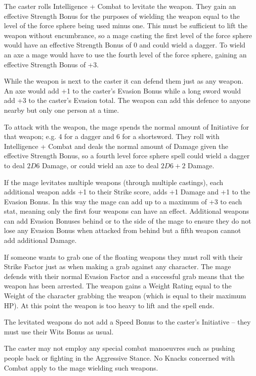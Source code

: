 \documentclass[titlepage,a4paper,openany]{book}
\begin{document}
\begin{multicols}{2}
The caster rolls Intelligence + Combat to levitate the weapon. They gain an effective Strength Bonus for the purposes of wielding the weapon equal to the level of the force sphere being used minus one. This must be sufficient to lift the weapon without encumbrance, so a mage casting the first level of the force sphere would have an effective Strength Bonus of 0 and could wield a dagger. To wield an axe a mage would have to use the fourth level of the force sphere, gaining an effective Strength Bonus of +3.

While the weapon is next to the caster it can defend them just as any weapon. An axe would add +1 to the caster's Evasion Bonus while a long sword would add +3 to the caster's Evasion total. The weapon can add this defence to anyone nearby but only one person at a time.

To attack with the weapon, the mage spends the normal amount of Initiative for that weapon; e.g. 4 for a dagger and 6 for a shortsword. They roll with Intelligence + Combat and deals the normal amount of Damage given the effective Strength Bonus, so a fourth level force sphere spell could wield a dagger to deal $2D6$ Damage, or could wield an axe to deal $2D6+2$ Damage.

If the mage levitates multiple weapons (through multiple castings), each additional weapon adds +1 to their Strike score, adds +1 Damage and +1 to the Evasion Bonus. In this way the mage can add up to a maximum of +3 to each stat, meaning only the first four weapons can have an effect. Additional weapons can add Evasion Bonuses behind or to the side of the mage to ensure they do not lose any Evasion Bonus when attacked from behind but a fifth weapon cannot add additional Damage.

If someone wants to grab one of the floating weapons they must roll with their Strike Factor just as when making a grab against any character. The mage defends with their normal Evasion Factor and a successful grab means that the weapon has been arrested. The weapon gains a Weight Rating equal to the Weight of the character grabbing the weapon (which is equal to their maximum HP). At this point the weapon is too heavy to lift and the spell ends.

The levitated weapons do not add a Speed Bonus to the caster's Initiative -- they must use their Wits Bonus as usual.

The caster may not employ any special combat manoeuvres such as pushing people back or fighting in the Aggressive Stance. No Knacks concerned with Combat apply to the mage wielding such weapons.


\end{multicols}
\end{document}
